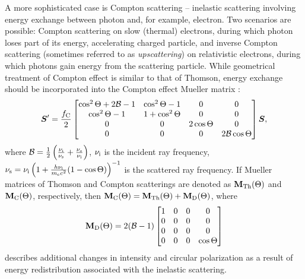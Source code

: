 A more sophisticated case is Compton scattering -- inelastic scattering involving energy exchange between photon and, for example, electron.
Two scenarios are possible: Compton scattering on slow (thermal) electrons, during which photon loses part of its energy, accelerating charged particle, and inverse Compton scattering (sometimes referred to as \textit{upscattering}) on relativistic electrons, during which photons gain energy from the scattering particle.
While geometrical treatment of Compton effect is similar to that of Thomson, energy exchange should be incorporated into the Compton effect Mueller matrix \citep{PolarizedLight2}:
\begin{equation}
    \boldsymbol{S}^\prime = \frac{f_{\mathrm{C}}}{2}
    \begin{bmatrix}
        \cos^2\Theta + 2\mathcal{B} - 1 & \cos^2\Theta - 1 & 0 & 0 \\
       \cos^2\Theta - 1 & 1 + \cos^2\Theta & 0 & 0 \\
        0 & 0 & 2\cos\Theta & 0 \\
        0 & 0 & 0 & 2\mathcal{B}\cos \Theta
    \end{bmatrix} \boldsymbol{S},
\end{equation}
where $\mathcal{B} = \frac{1}{2}\left(\frac{\nu_{\mathrm{i}}}{\nu_{\mathrm{s}}} + \frac{\nu_{\mathrm{s}}}{\nu_{\mathrm{i}}}\right)$, $\nu_{\mathrm{i}}$ is the incident ray frequency, $\nu_{\mathrm{s}} = \nu_{\mathrm{i}}\left(1 + \frac{h\nu_{\mathrm{i}}}{m_{\mathrm{e}}c^2}(1 - \cos\Theta)\right)^{-1}$ is the scattered ray frequency.
If Mueller matrices of Thomson and Compton scatterings are denoted as $\mathbf{M}_{\mathrm{Th}}(\Theta)$ and $\mathbf{M}_{\mathrm{C}}(\Theta)$, respectively, then $\mathbf{M}_{\mathrm{C}}(\Theta) = \mathbf{M}_{\mathrm{Th}}(\Theta) + \mathbf{M}_{\mathrm{D}}(\Theta)$, where 
\begin{equation}
    \mathbf{M}_{\mathrm{D}}(\Theta) =  2(\mathcal{B} - 1)
    \begin{bmatrix}
        1 & 0 & 0 & 0\\
        0 & 0 & 0 & 0 \\
        0 & 0 & 0 & 0 \\
        0 & 0 & 0 & \cos\Theta
    \end{bmatrix}
\end{equation}
describes additional changes in intensity and circular polarization as a result of energy redistribution associated with the inelastic scattering. 

